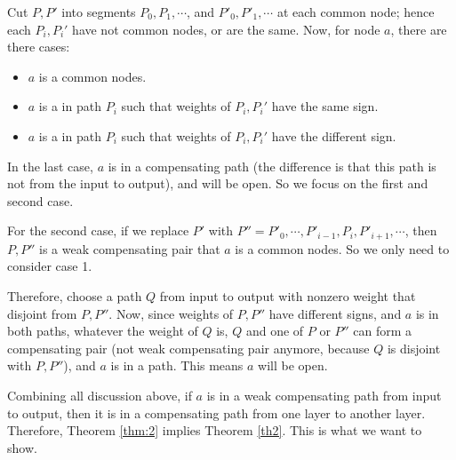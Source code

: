 			Cut $P,P'$ into segments $P_0,P_1,\cdots$, and $P'_0,P'_1,\cdots$ at each common node; hence each $P_i,P_i'$ have not common nodes, or are the same. Now, for node $a$, there are there cases:
			\begin{itemize}
				\item $a$ is a common nodes.
				
				\item  $a$ is a in path $P_i$ such that weights of $P_i,P_i'$ have the same sign.
				
				\item  $a$ is a in path $P_i$ such that weights of $P_i,P_i'$ have the different sign.
			\end{itemize}
			
			In the last case, $a$ is in a compensating path (the difference is that this path is not from the input to output), and will be open. So we focus on the first and second case.
			
			For the second case, if we replace $P'$ with $P''=P'_0,\cdots,P'_{i-1},P_{i},P'_{i+1},\cdots$, then $P,P''$ is a weak compensating pair that $a$ is a common nodes. So we only need to consider case 1.
			
			Therefore, choose a path $Q$ from input to output with nonzero weight that disjoint from $P,P''$. Now, since weights of $P,P''$ have different signs, and $a$ is in both paths, whatever the weight of $Q$ is, $Q$ and one of  $P$ or $P''$ can form a compensating pair (not weak compensating pair anymore, because $Q$ is disjoint with $P,P''$), and $a$ is in a path. This means $a$ will be open.
			
			Combining all discussion above, if $a$ is in a weak compensating path from input to output, then it is in a compensating path from one layer to another layer. Therefore, Theorem \ref{thm:2} implies Theorem \ref{th2}. This is what we want to show.
			
 			
			
